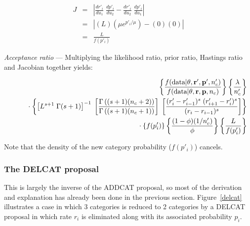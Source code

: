 \documentclass[12pt]{article}
\newcommand{\ncat}{n_c}
\newcommand{\newprobmean}{\mu}
\begin{document}
\begin{eqnarray*}
J & = & \left| \frac{d r'_i}{d u_1} \; \frac{d p'_i}{d u_2} - \frac{d r'_i}{d u_2} \; \frac{d p'_i}{d u_1} \right| \\
& = & \left| \left( L \right) \left( \newprobmean e^{p'_i/\newprobmean} \right) - \left( 0 \right) \left( 0 \right) \right| \\
& = & \frac{L}{f(p'_i)} 
\end{eqnarray*}

{\em Acceptance ratio} --- Multiplying the likelihood ratio, prior ratio, Hastings ratio and Jacobian together yields:

\begin{eqnarray*}
& & \left\{ 
  \frac{f(\mbox{data} | {\bf \theta}, {\bf r}', {\bf p}', \ncat')}{f(\mbox{data} | {\bf \theta}, {\bf r}, {\bf p}, \ncat)} 
\right\}
\left\{ 
  \frac{\lambda}{\ncat'} 
\right\} \\
& & \rule{.2in}{.0in} \cdot 
\left\{ 
  \left[ L^{s+1} \; \Gamma(s+1)\right]^{-1} \; 
    \left[ \frac{\Gamma\left( (s+1) (\ncat + 2) \right)}{\Gamma\left( (s+1) (\ncat + 1) \right)} \right] \;
    \left[ \frac{(r'_i - r'_{i-1})^s \; (r'_{i+1} - r'_i)^s}{(r_i - r_{i-1})^s} \right]
\right\} \\
& & \rule{.2in}{.0in} \cdot 
\left\{ 
  f(p'_i)
\right\} 
\left\{ 
  \frac{(1-\phi)(1/\ncat')}{\phi} 
\right\}
\left\{ 
  \frac{L}{f(p'_i)}
\right\}
\end{eqnarray*}

Note that the density of the new category probability ($f(p'_i)$) cancels.


\subsubsection{The DELCAT proposal}

This is largely the inverse of the ADDCAT proposal, so most of the derivation and explanation has already been done in the previous section. Figure~\ref{delcat} illustrates a case in which 3 categories is reduced to 2 categories by a DELCAT proposal in which rate $r_i$ is eliminated along with its associated probability $p_i$.
\end{document}

